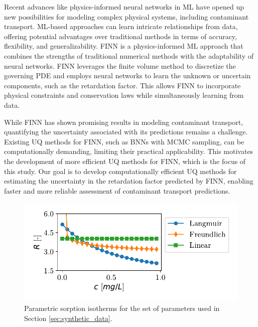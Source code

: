 Recent advances like physics-informed neural networks in ML have opened up new possibilities for modeling complex physical systems, including contaminant transport. ML-based approaches can learn intricate relationships from data, offering potential advantages over traditional methods in terms of accuracy, flexibility, and generalizability. FINN \cite{finn} is a physics-informed ML approach that combines the strengths of traditional numerical methods with the adaptability of neural networks. FINN leverages the finite volume method to discretize the governing PDE and employs neural networks to learn the unknown or uncertain components, such as the retardation factor. This allows FINN to incorporate physical constraints and conservation laws while simultaneously learning from data.

While FINN has shown promising results in modeling contaminant transport, quantifying the uncertainty associated with its predictions remains a challenge. Existing UQ methods for FINN, such as BNNs with MCMC sampling, can be computationally demanding, limiting their practical applicability. This motivates the development of more efficient UQ methods for FINN, which is the focus of this study. Our goal is to develop computationally efficient UQ methods for estimating the uncertainty in the retardation factor predicted by FINN, enabling faster and more reliable assessment of contaminant transport predictions.

\begin{figure}[h]
    \centering
    \includegraphics{figs/parametric_isotherms.pdf}
    \caption{Parametric sorption isotherms for the set of parameters used in Section \vref{sec:synthetic_data}.}
    \label{fig:parametric_isotherms}
\end{figure}



